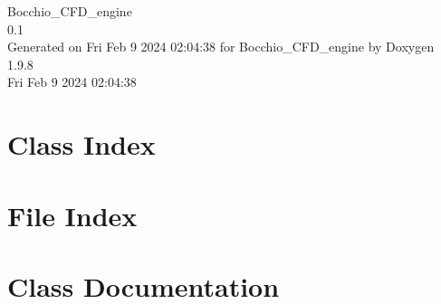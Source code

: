 \documentclass[twoside]{book}
\newcommand{\+}{\discretionary{\mbox{\scriptsize$\hookleftarrow$}}{}{}}
\newcommand{\clearemptydoublepage}{%
    \newpage{\pagestyle{empty}\cleardoublepage}%
  }
\begin{document}
  \raggedbottom
    \hypersetup{pageanchor=false,
                bookmarksnumbered=true,
                pdfencoding=unicode
               }
  \begin{titlepage}
  \vspace*{7cm}
  \begin{center}%
  {\Large Bocchio\+\_\+\+CFD\+\_\+engine}\\
  [1ex]\large 0.\+1 \\
  \vspace*{1cm}
  {\large Generated on Fri Feb 9 2024 02\+:04\+:38 for Bocchio\+\_\+\+CFD\+\_\+engine by Doxygen 1.9.8}\\
    \vspace*{0.5cm}
    {\small Fri Feb 9 2024 02:04:38}
  \end{center}
  \end{titlepage}
  \clearemptydoublepage
  \tableofcontents
  \clearemptydoublepage
  \hypersetup{pageanchor=true}

\chapter{Class Index}

\chapter{File Index}

\chapter{Class Documentation}

































\end{document}
